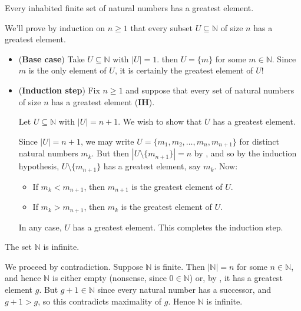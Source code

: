 \begin{lemma}
\label{lemFinSetGreatestElement}
Every inhabited finite set of natural numbers has a greatest element.
\end{lemma}
\begin{cproof}
We'll prove by induction on $n \ge 1$ that every subset $U \subseteq \mathbb{N}$ of size $n$ has a greatest element.
\begin{itemize}
\item (\textbf{Base case}) Take $U \subseteq \mathbb{N}$ with $|U|=1$. then $U = \{ m \}$ for some $m \in \mathbb{N}$. Since $m$ is the only element of $U$, it is certainly the greatest element of $U$!

\item (\textbf{Induction step}) Fix $n \ge 1$ and suppose that every set of natural numbers of size $n$ has a greatest element (\textbf{IH}).

Let $U \subseteq \mathbb{N}$ with $|U| = n+1$. We wish to show that $U$ has a greatest element.

Since $|U| = n+1$, we may write $U = \{ m_1, m_2, \dots, m_n, m_{n+1} \}$ for distinct natural numbers $m_k$. But then $|U \setminus \{ m_{n+1} \}| = n$ by , and so by the induction hypothesis, $U \setminus \{ m_{n+1} \}$ has a greatest element, say $m_k$. Now:
\begin{itemize}
\item If $m_k < m_{n+1}$, then $m_{n+1}$ is the greatest element of $U$.
\item If $m_k > m_{n+1}$, then $m_k$ is the greatest element of $U$.
\end{itemize}
In any case, $U$ has a greatest element. This completes the induction step.
\end{itemize}
\end{cproof}

\begin{theorem}
\label{thmNIsInfinite}
The set $\mathbb{N}$ is infinite.
\end{theorem}

\begin{cproof}
We proceed by contradiction. Suppose $\mathbb{N}$ is finite. Then $|\mathbb{N}| = n$ for some $n \in \mathbb{N}$, and hence $\mathbb{N}$ is either empty (nonsense, since $0 \in \mathbb{N}$) or, by , it has a greatest element $g$. But $g+1 \in \mathbb{N}$ since every natural number has a successor, and $g+1 > g$, so this contradicts maximality of $g$. Hence $\mathbb{N}$ is infinite.
\end{cproof}